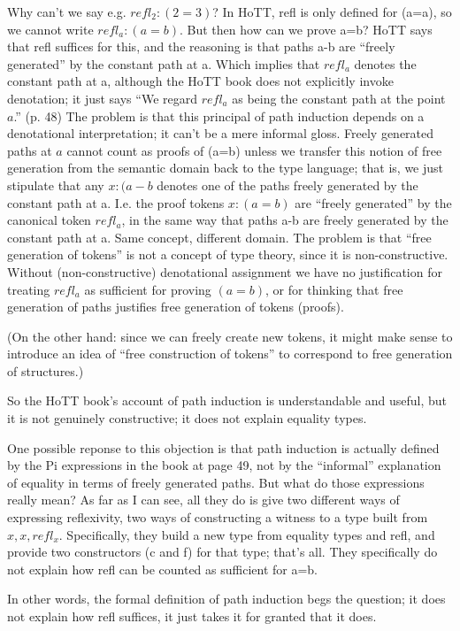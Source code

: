 \documentclass{article}
\begin{document}
Why can't we say e.g. \(refl_2 : (2 = 3)\)?  In HoTT, refl is only
defined for (a=a), so we cannot write \(refl_a : (a = b)\).  But then
how can we prove a=b?  HoTT says that refl suffices for this, and the
reasoning is that paths a-b are ``freely generated'' by the constant
path at a.  Which implies that \(refl_a\) denotes the constant path at
a, although the HoTT book does not explicitly invoke denotation; it
just says ``We regard \(refl_a\) as being the constant path at the
point \(a\).'' (p. 48) The problem is that this principal of path
induction depends on a denotational interpretation; it can't be a mere
informal gloss.  Freely generated paths at \(a\) cannot count as
proofs of (a=b) unless we transfer this notion of free generation from
the semantic domain back to the type language; that is, we just
stipulate that any \(x:(a-b\) denotes one of the paths freely
generated by the constant path at a.  I.e. the proof tokens
\(x:(a=b)\) are ``freely generated'' by the canonical token
\(refl_a\), in the same way that paths a-b are freely generated by the
constant path at a.  Same concept, different domain.  The problem is
that ``free generation of tokens'' is not a concept of type theory,
since it is non-constructive.  Without (non-constructive) denotational
assignment we have no justification for treating \(refl_a\) as
sufficient for proving \((a=b)\), or for thinking that free generation
of paths justifies free generation of tokens (proofs).

(On the other hand: since we can freely create new tokens, it might
make sense to introduce an idea of ``free construction of tokens'' to
correspond to free generation of structures.)

So the HoTT book's account of path induction is understandable and
useful, but it is not genuinely constructive; it does not explain
equality types.

One possible reponse to this objection is that path induction
is actually defined by the Pi expressions in the book at page 49, not
by the ``informal'' explanation of equality in terms of freely
generated paths.  But what do those expressions really mean?  As far
as I can see, all they do is give two different ways of expressing
reflexivity, two ways of constructing a witness to a type built from
\(x, x, refl_x\).  Specifically, they build a new type from equality
types and refl, and provide two constructors (c and f) for that type;
that's all.  They specifically do not explain how refl can be counted
as sufficient for a=b.

In other words, the formal definition of path induction begs the
question; it does not explain how refl suffices, it just takes it for
granted that it does.
\end{document}
